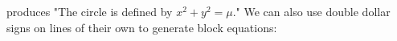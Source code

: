 produces "The circle is defined by $x^2 + y^2 = \mu$."
We can also use double dollar signs on lines of their own to generate block equations:
